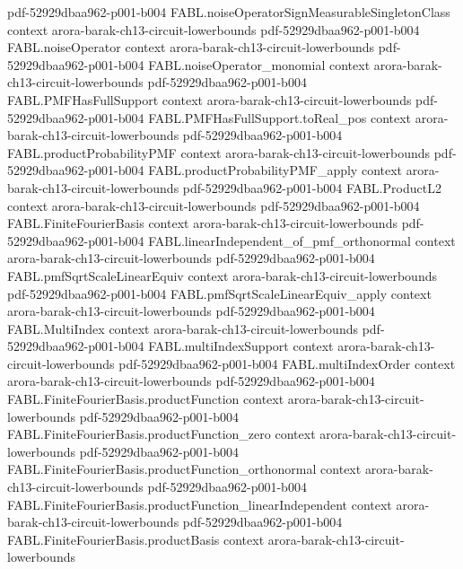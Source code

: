 \begin{theorem}
  {pdf-52929dbaa962-p001-b004}
\proofstep
  {FABL.noiseOperatorSignMeasurableSingletonClass}
  {context}
  {arora-barak-ch13-circuit-lowerbounds}
  {pdf-52929dbaa962-p001-b004}
\proofstep
  {FABL.noiseOperator}
  {context}
  {arora-barak-ch13-circuit-lowerbounds}
  {pdf-52929dbaa962-p001-b004}
\proofstep
  {FABL.noiseOperator_monomial}
  {context}
  {arora-barak-ch13-circuit-lowerbounds}
  {pdf-52929dbaa962-p001-b004}
\proofstep
  {FABL.PMFHasFullSupport}
  {context}
  {arora-barak-ch13-circuit-lowerbounds}
  {pdf-52929dbaa962-p001-b004}
\proofstep
  {FABL.PMFHasFullSupport.toReal_pos}
  {context}
  {arora-barak-ch13-circuit-lowerbounds}
  {pdf-52929dbaa962-p001-b004}
\proofstep
  {FABL.productProbabilityPMF}
  {context}
  {arora-barak-ch13-circuit-lowerbounds}
  {pdf-52929dbaa962-p001-b004}
\proofstep
  {FABL.productProbabilityPMF_apply}
  {context}
  {arora-barak-ch13-circuit-lowerbounds}
  {pdf-52929dbaa962-p001-b004}
\proofstep
  {FABL.ProductL2}
  {context}
  {arora-barak-ch13-circuit-lowerbounds}
  {pdf-52929dbaa962-p001-b004}
\proofstep
  {FABL.FiniteFourierBasis}
  {context}
  {arora-barak-ch13-circuit-lowerbounds}
  {pdf-52929dbaa962-p001-b004}
\proofstep
  {FABL.linearIndependent_of_pmf_orthonormal}
  {context}
  {arora-barak-ch13-circuit-lowerbounds}
  {pdf-52929dbaa962-p001-b004}
\proofstep
  {FABL.pmfSqrtScaleLinearEquiv}
  {context}
  {arora-barak-ch13-circuit-lowerbounds}
  {pdf-52929dbaa962-p001-b004}
\proofstep
  {FABL.pmfSqrtScaleLinearEquiv_apply}
  {context}
  {arora-barak-ch13-circuit-lowerbounds}
  {pdf-52929dbaa962-p001-b004}
\proofstep
  {FABL.MultiIndex}
  {context}
  {arora-barak-ch13-circuit-lowerbounds}
  {pdf-52929dbaa962-p001-b004}
\proofstep
  {FABL.multiIndexSupport}
  {context}
  {arora-barak-ch13-circuit-lowerbounds}
  {pdf-52929dbaa962-p001-b004}
\proofstep
  {FABL.multiIndexOrder}
  {context}
  {arora-barak-ch13-circuit-lowerbounds}
  {pdf-52929dbaa962-p001-b004}
\proofstep
  {FABL.FiniteFourierBasis.productFunction}
  {context}
  {arora-barak-ch13-circuit-lowerbounds}
  {pdf-52929dbaa962-p001-b004}
\proofstep
  {FABL.FiniteFourierBasis.productFunction_zero}
  {context}
  {arora-barak-ch13-circuit-lowerbounds}
  {pdf-52929dbaa962-p001-b004}
\proofstep
  {FABL.FiniteFourierBasis.productFunction_orthonormal}
  {context}
  {arora-barak-ch13-circuit-lowerbounds}
  {pdf-52929dbaa962-p001-b004}
\proofstep
  {FABL.FiniteFourierBasis.productFunction_linearIndependent}
  {context}
  {arora-barak-ch13-circuit-lowerbounds}
  {pdf-52929dbaa962-p001-b004}
\proofstep
  {FABL.FiniteFourierBasis.productBasis}
  {context}
  {arora-barak-ch13-circuit-lowerbounds}

\end{theorem}
